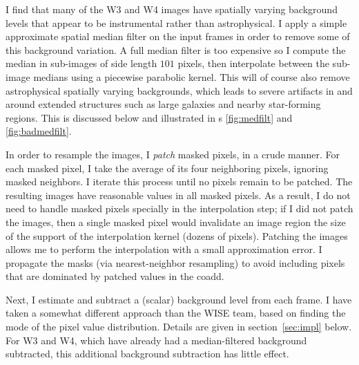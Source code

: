 \documentclass[11pt,preprint]{aastex}
\newcommand{\secref}[1]{section~\ref{#1}}
\begin{document}
I find that many of the W3 and W4 images have spatially varying
background levels that appear to be instrumental rather than
astrophysical.  I apply a simple approximate spatial median filter on
the input frames in order to remove some of this background variation.
A full median filter is too expensive so I compute the median in
sub-images of side length $101$ pixels, then interpolate between the
sub-image medians using a piecewise parabolic kernel.  This will of
course also remove astrophysical spatially varying backgrounds, which
leads to severe artifacts in and around extended structures such as
large galaxies and nearby star-forming regions.  This is discussed
below and illustrated in \figurename s \ref{fig:medfilt} and
\ref{fig:badmedfilt}.


In order to resample the images, I \emph{patch} masked pixels, in a
crude manner.  For each masked pixel, I take the average of its four
neighboring pixels, ignoring masked neighbors.  I iterate this
process until no pixels remain to be patched.  The resulting images
have reasonable values in all masked pixels.  As a result, I do not
need to handle masked pixels specially in the interpolation step; if
I did not patch the images, then a single masked pixel would
invalidate an image region the size of the support of the
interpolation kernel (dozens of pixels).  Patching the images allows
me to perform the interpolation with a small approximation error.
I propagate the masks (via nearest-neighbor resampling) to
avoid including pixels that are dominated by patched values in the
coadd.




Next, I estimate and subtract a (scalar) background level from each
frame.  I have taken a somewhat different approach than the WISE
team, based on finding the mode of the pixel value distribution.
Details are given in \secref{sec:impl} below.  For W3 and W4, which
have already had a median-filtered background subtracted, this
additional background subtraction has little effect.
\end{document}
